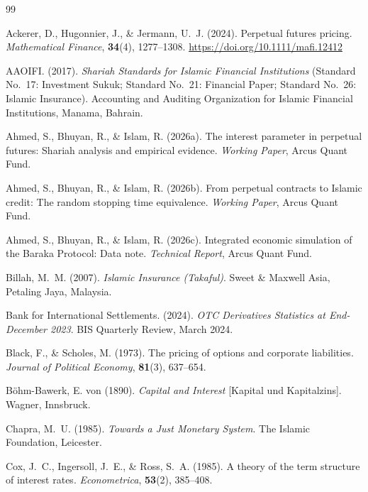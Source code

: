 \documentclass[10pt,twocolumn]{article}
\theoremstyle{plain}
\theoremstyle{definition}
\begin{document}

\begin{thebibliography}{99}

Ackerer, D., Hugonnier, J., \& Jermann, U.~J. (2024).
Perpetual futures pricing.
\textit{Mathematical Finance}, \textbf{34}(4), 1277--1308.
\url{https://doi.org/10.1111/mafi.12412}

AAOIFI. (2017).
\textit{Shariah Standards for Islamic Financial Institutions}
(Standard No.~17: Investment Sukuk; Standard No.~21: Financial
Paper; Standard No.~26: Islamic Insurance).
Accounting and Auditing Organization for Islamic Financial
Institutions, Manama, Bahrain.

Ahmed, S., Bhuyan, R., \& Islam, R. (2026a).
The interest parameter in perpetual futures: Shariah analysis
and empirical evidence.
\textit{Working Paper}, Arcus Quant Fund.

Ahmed, S., Bhuyan, R., \& Islam, R. (2026b).
From perpetual contracts to Islamic credit: The random stopping
time equivalence.
\textit{Working Paper}, Arcus Quant Fund.

Ahmed, S., Bhuyan, R., \& Islam, R. (2026c).
Integrated economic simulation of the Baraka Protocol: Data note.
\textit{Technical Report}, Arcus Quant Fund.

Billah, M.~M. (2007).
\textit{Islamic Insurance (Takaful)}.
Sweet \& Maxwell Asia, Petaling Jaya, Malaysia.

Bank for International Settlements. (2024).
\textit{OTC Derivatives Statistics at End-December 2023}.
BIS Quarterly Review, March 2024.

Black, F., \& Scholes, M. (1973).
The pricing of options and corporate liabilities.
\textit{Journal of Political Economy}, \textbf{81}(3), 637--654.

Böhm-Bawerk, E. von (1890).
\textit{Capital and Interest} [Kapital und Kapitalzins].
Wagner, Innsbruck.

Chapra, M.~U. (1985).
\textit{Towards a Just Monetary System}.
The Islamic Foundation, Leicester.

Cox, J.~C., Ingersoll, J.~E., \& Ross, S.~A. (1985).
A theory of the term structure of interest rates.
\textit{Econometrica}, \textbf{53}(2), 385--408.


\end{thebibliography}
\end{document}
